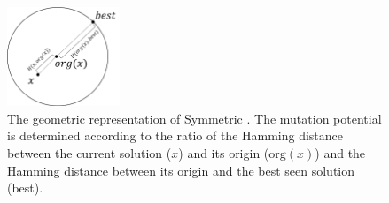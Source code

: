 \documentclass[lettersize,journal]{IEEEtran}
\begin{document}
\begin{figure}[t!]
\centering
\includegraphics[width=0.3\textwidth]{newhd}
\caption{The geometric representation of Symmetric \expoHD. The mutation potential is determined according to the 
	ratio of the Hamming distance between the current solution ($x$) and its origin ($\text{org}(x)$) and 
	the Hamming distance between its origin and the best seen solution (best).}
\label{fig:symexpoHD}
\end{figure}






\end{document}
